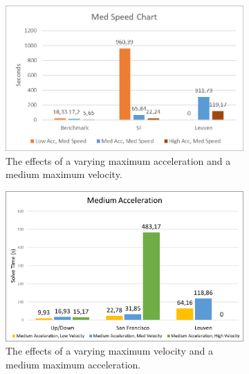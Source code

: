 \begin{figure}
	\centering
	
	\begin{subfigure}[t]{\textwidth}
        		\includegraphics[width=\textwidth]{img/agility-med-speed}
        		\caption{The effects of a varying maximum acceleration and a medium maximum velocity.}
        		\label{fig:agility-med-speed}
	\end{subfigure}
	\par\bigskip	
	\begin{subfigure}[t]{\textwidth}
        		\includegraphics[width=\textwidth]{img/agility-med-acc}
        		\caption{The effects of a varying maximum velocity and a medium maximum acceleration.}
        		\label{fig:agility-med-acc}
	\end{subfigure}	
	
        
    \caption[The medium velocity and medium acceleration results]{}\label{fig:agility-med}
\end{figure}

